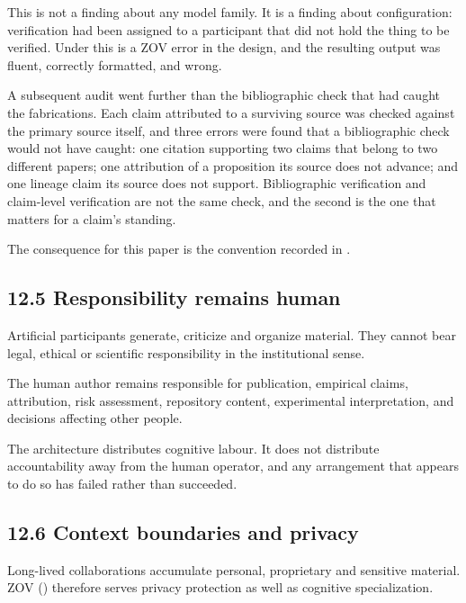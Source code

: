 This is not a finding about any model family. It is a finding about configuration: verification had been assigned to a participant that did not hold the thing to be verified. Under  this is a ZOV error in the design, and the resulting output was fluent, correctly formatted, and wrong.

A subsequent audit went further than the bibliographic check that had caught the fabrications. Each claim attributed to a surviving source was checked against the primary source itself, and three errors were found that a bibliographic check would not have caught: one citation supporting two claims that belong to two different papers; one attribution of a proposition its source does not advance; and one lineage claim its source does not support. Bibliographic verification and claim-level verification are not the same check, and the second is the one that matters for a claim's standing.

The consequence for this paper is the convention recorded in .


\subsection*{12.5 Responsibility remains human}
\label{sec:en:12.5}

Artificial participants generate, criticize and organize material. They cannot bear legal, ethical or scientific responsibility in the institutional sense.

The human author remains responsible for publication, empirical claims, attribution, risk assessment, repository content, experimental interpretation, and decisions affecting other people.

The architecture distributes cognitive labour. It does not distribute accountability away from the human operator, and any arrangement that appears to do so has failed rather than succeeded.


\subsection*{12.6 Context boundaries and privacy}
\label{sec:en:12.6}

Long-lived collaborations accumulate personal, proprietary and sensitive material. ZOV () therefore serves privacy protection as well as cognitive specialization.

